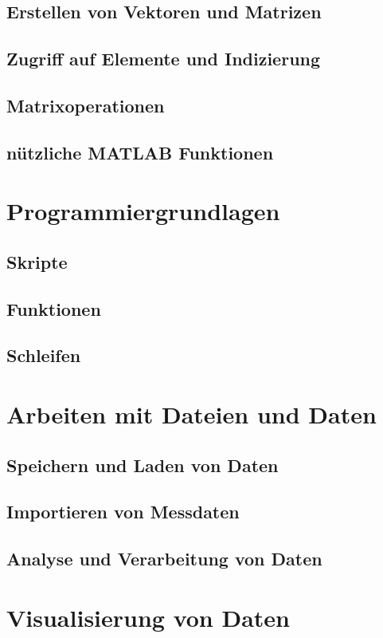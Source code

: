 \documentclass[12pt, a4paper, twoside]{article}
\begin{document}
        \subsection{Erstellen von Vektoren und Matrizen}
        \subsection{Zugriff auf Elemente und Indizierung}
        \subsection{Matrixoperationen}
        \subsection{nützliche MATLAB Funktionen}
    \section{Programmiergrundlagen}
        \subsection{Skripte}
        \subsection{Funktionen}
        \subsection{Schleifen}
    \section{Arbeiten mit Dateien und Daten}
        \subsection{Speichern und Laden von Daten}
        \subsection{Importieren von Messdaten}
        \subsection{Analyse und Verarbeitung von Daten}
    \section{Visualisierung von Daten}
\end{document}
